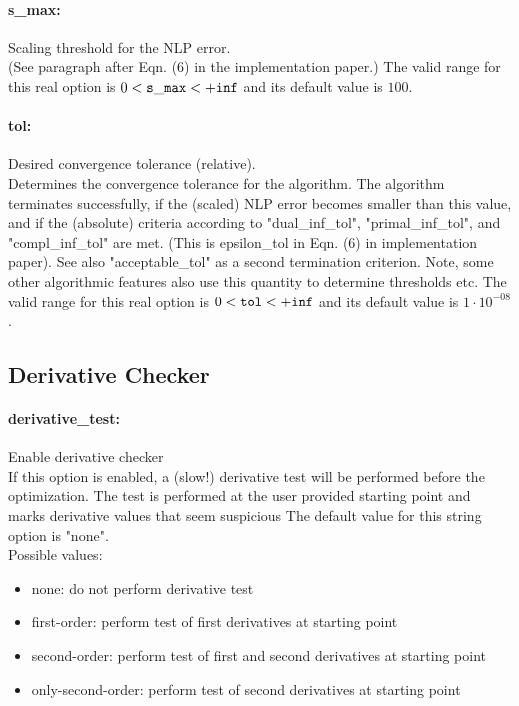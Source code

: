 \paragraph{s\_max:}\label{opt:s_max} Scaling threshold for the NLP error. \\
 (See paragraph after Eqn. (6) in the implementation paper.) The valid range for this real option is 
$0 <  {\tt s\_max } <  {\tt +inf}$
and its default value is $100$.


\paragraph{tol:}\label{opt:tol} Desired convergence tolerance (relative). \\
 Determines the convergence tolerance for the algorithm.  The algorithm terminates successfully, if the (scaled) NLP error becomes smaller than this value, and if the (absolute) criteria according to "dual\_inf\_tol", "primal\_inf\_tol", and "compl\_inf\_tol" are met.  (This is epsilon\_tol in Eqn. (6) in implementation paper).  See also "acceptable\_tol" as a second termination criterion.  Note, some other algorithmic features also use this quantity to determine thresholds etc. The valid range for this real option is 
$0 <  {\tt tol } <  {\tt +inf}$
and its default value is $1 \cdot 10^{-08}$.


\subsection{Derivative Checker}
\label{sec:DerivativeChecker}
\paragraph{derivative\_test:}\label{opt:derivative_test} Enable derivative checker \\
 If this option is enabled, a (slow!) derivative test will be performed before the optimization.  The test is performed at the user provided starting point and marks derivative values that seem suspicious The default value for this string option is "none".
\\ 
Possible values:
\begin{itemize}
   \item none: do not perform derivative test
   \item first-order: perform test of first derivatives at starting point
   \item second-order: perform test of first and second derivatives at starting point
   \item only-second-order: perform test of second derivatives at starting point
\end{itemize}

